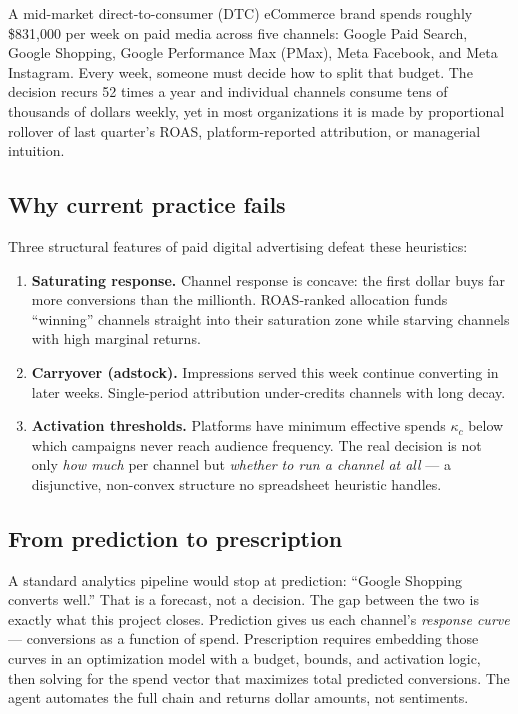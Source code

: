 \documentclass[11pt]{article}
\begin{document}
A mid-market direct-to-consumer (DTC) eCommerce brand spends roughly \$831{,}000 per week on paid media across five channels: Google Paid Search, Google Shopping, Google Performance Max (PMax), Meta Facebook, and Meta Instagram. Every week, someone must decide how to split that budget. The decision recurs 52 times a year and individual channels consume tens of thousands of dollars weekly, yet in most organizations it is made by proportional rollover of last quarter's ROAS, platform-reported attribution, or managerial intuition.

\subsection{Why current practice fails}

Three structural features of paid digital advertising defeat these heuristics:

\begin{enumerate}[nosep]
  \item \textbf{Saturating response.} Channel response is concave: the first dollar buys far more conversions than the millionth. ROAS-ranked allocation funds ``winning'' channels straight into their saturation zone while starving channels with high marginal returns.
  \item \textbf{Carryover (adstock).} Impressions served this week continue converting in later weeks. Single-period attribution under-credits channels with long decay.
  \item \textbf{Activation thresholds.} Platforms have minimum effective spends $\kappa_c$ below which campaigns never reach audience frequency. The real decision is not only \emph{how much} per channel but \emph{whether to run a channel at all} --- a disjunctive, non-convex structure no spreadsheet heuristic handles.
\end{enumerate}

\subsection{From prediction to prescription}

A standard analytics pipeline would stop at prediction: ``Google Shopping converts well.'' That is a forecast, not a decision. The gap between the two is exactly what this project closes. Prediction gives us each channel's \emph{response curve} --- conversions as a function of spend. Prescription requires embedding those curves in an optimization model with a budget, bounds, and activation logic, then solving for the spend vector that maximizes total predicted conversions. The agent automates the full chain and returns dollar amounts, not sentiments.
\end{document}
